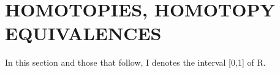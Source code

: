\section{HOMOTOPIES, HOMOTOPY EQUIVALENCES}

In this section and those that follow, I denotes the interval {[}0,1{]} of R.

